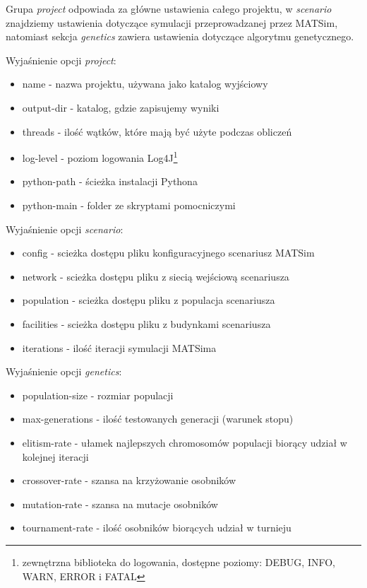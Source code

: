 \documentclass[twoside,12pt]{report}
\begin{document}
\vspace*{15px}

Grupa \textit{project} odpowiada za główne ustawienia całego projektu, w \textit{scenario} znajdziemy ustawienia dotyczące symulacji przeprowadzanej przez MATSim, natomiast sekcja \textit{genetics} zawiera ustawienia dotyczące algorytmu genetycznego.

\vspace*{15px}

Wyjaśnienie opcji \textit{project}:
\begin{itemize}
\item name - nazwa projektu, używana jako katalog wyjściowy
\item output-dir - katalog, gdzie zapisujemy wyniki
\item threads - ilość wątków, które mają być użyte podczas obliczeń
\item log-level - poziom logowania Log4J\footnote{zewnętrzna biblioteka do logowania, dostępne poziomy: DEBUG, INFO, WARN, ERROR i FATAL}
\item python-path - ścieżka instalacji Pythona
\item python-main - folder ze skryptami pomocniczymi
\end{itemize}

\vspace*{15px}

Wyjaśnienie opcji \textit{scenario}:
\begin{itemize}
\item config - scieżka dostępu pliku konfiguracyjnego scenariusz MATSim
\item network - scieżka dostępu pliku z siecią wejściową scenariusza
\item population - scieżka dostępu pliku z populacja scenariusza
\item facilities - scieżka dostępu pliku z budynkami scenariusza
\item iterations - ilość iteracji symulacji MATSima
\end{itemize}

\vspace*{15px}

Wyjaśnienie opcji \textit{genetics}:
\begin{itemize}
\item population-size - rozmiar populacji
\item max-generations - ilość testowanych generacji (warunek stopu)
\item elitism-rate - ułamek najlepszych chromosomów populacji biorący udział w kolejnej iteracji
\item crossover-rate - szansa na krzyżowanie osobników
\item mutation-rate - szansa na mutacje osobników
\item tournament-rate - ilość osobników biorących udział w turnieju
\end{itemize}
\end{document}
